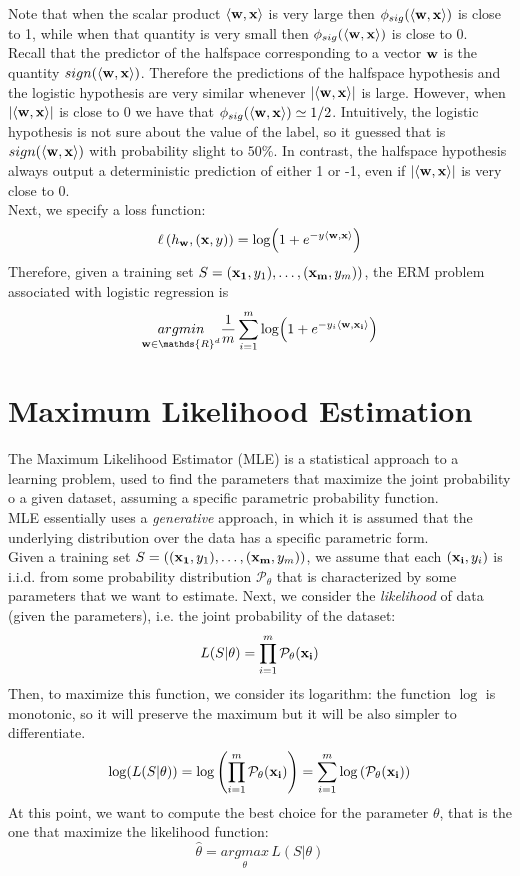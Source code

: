 \documentclass[12pt]{report}
\theoremstyle{plain}
\newcommand\mcl[1]{\mathcal{#1}}
\newcommand\sprod[2]{\langle \vb{#1},\vb{#2}\rangle}
\begin{document}
\begin{flushleft}
Note that when the scalar product $\sprod{w}{x}$ is very large then 
$\phi_{sig}(\sprod{w}{x})$ is close to 1, while when that quantity is very 
small then $\phi_{sig}(\sprod{w}{x})$ is close to 0.\\
Recall that the predictor of the halfspace corresponding to a vector $\vb{w}$ 
is the quantity $sign(\sprod{w}{x})$. Therefore the predictions of the 
halfspace hypothesis and the logistic hypothesis are very similar whenever 
$\abs{\sprod{w}{x}}$ is large. However, when $\abs{\sprod{w}{x}}$ is close to 0 
we have that $\phi_{sig}(\sprod{w}{x})\simeq 1/2$. Intuitively, the logistic 
hypothesis is not sure about the value of the label, so it guessed that is 
$sign(\sprod{w}{x})$ with probability slight to $50\%$. In contrast, the 
halfspace hypothesis always output a deterministic prediction of either 1 or 
-1, even if $\abs{\sprod{w}{x}}$ is very close to 0.\\
Next, we specify a loss function:
\[ \ell\left(h_{\vb{w}},(\vb{x},y)\right)=\log(1+e^{-y\sprod{w}{x}}) \]
Therefore, given a training set $S=(\vb{x_1},y_1),\dots,(\vb{x_m},y_m))$, the 
ERM problem associated with logistic regression is
\[ \underset{\vb{w}\in\mathds{R}^d}{argmin} \frac{1}{m}\sum_{i=1}^m 
\log(1+e^{-y_i\sprod{w}{x_i}}) \]


 \section{Maximum Likelihood Estimation}
The Maximum Likelihood Estimator (MLE) is a statistical approach to a learning 
problem, used to find the parameters that maximize the joint probability o a 
given dataset, assuming a specific parametric probability function.\\
MLE essentially uses a \textit{generative} approach, in which it is assumed 
that the underlying distribution over the data has a specific parametric form.\\
Given a training set $S=((\vb{x_1},y_1),\dots,(\vb{x_m},y_m))$, we assume that 
each $(\vb{x_i},y_i)$ is i.i.d. from some probability distribution 
$\mcl{P}_\theta$ that is characterized by some parameters that we want to 
estimate. Next, we consider the \textit{likelihood} of data (given the 
parameters), i.e. the joint probability of the dataset:
\[ L(S|\theta)=\prod_{i=1}^m\mcl{P}_\theta(\vb{x_i}) \]
Then, to maximize this function, we consider its logarithm: the function $\log$ 
is monotonic, so it will preserve the maximum but it will be also simpler to 
differentiate.
\[ 
\log(L(S|\theta))=\log\left(\prod_{i=1}^m\mcl{P}_\theta(\vb{x_i})\right)=\sum_{i=1}^m\log\left(\mcl{P}_\theta(\vb{x_i})\right)
  \]
At this point, we want to compute the best choice for the parameter $\theta$, 
that is the one that maximize the likelihood function:
\[ \hat{\theta}=\underset{\theta}{argmax}\, L(S|\theta) \]


\end{flushleft}
\end{document}

